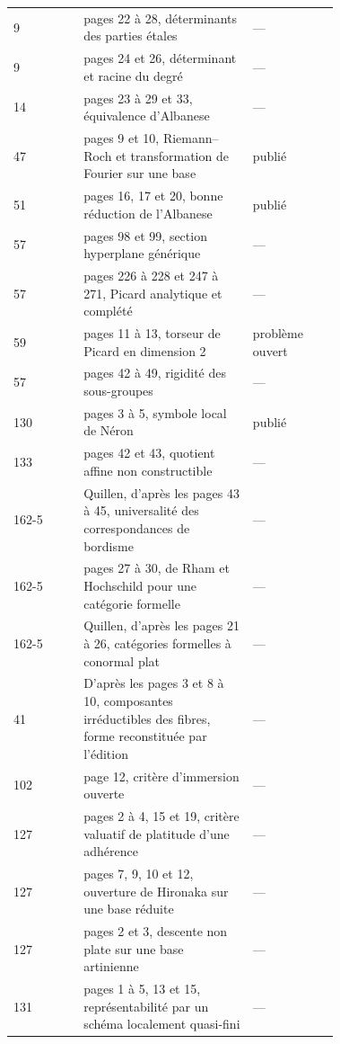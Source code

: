 {\begin{longtable}{@{}l>{\raggedright\arraybackslash}p{0.52\linewidth}>{\raggedright\arraybackslash}p{0.2\linewidth}r@{}}
9 & pages 22 à 28, déterminants des parties étales & --- & \pageref{nv:39}\\
9 & pages 24 et 26, déterminant et racine du degré & --- & \pageref{nv:40}\\
14 & pages 23 à 29 et 33, équivalence d'Albanese & --- & \pageref{nv:41}\\
47 & pages 9 et 10, Riemann--Roch et transformation de Fourier sur une base & publié & \pageref{nv:42}\\
51 & pages 16, 17 et 20, bonne réduction de l'Albanese & publié & \pageref{nv:43}\\
57 & pages 98 et 99, section hyperplane générique & --- & \pageref{nv:44}\\
57 & pages 226 à 228 et 247 à 271, Picard analytique et complété & --- & \pageref{nv:45}\\
59 & pages 11 à 13, torseur de Picard en dimension 2 & problème ouvert & \pageref{nv:46}\\
57 & pages 42 à 49, rigidité des sous-groupes & --- & \pageref{nv:47}\\
130 & pages 3 à 5, symbole local de Néron & publié & \pageref{nv:48}\\
133 & pages 42 et 43, quotient affine non constructible & --- & \pageref{nv:49}\\
162-5 & Quillen, d'après les pages 43 à 45, universalité des correspondances de bordisme & --- & \pageref{nv:50}\\
162-5 & pages 27 à 30, de Rham et Hochschild pour une catégorie formelle & --- & \pageref{nv:51}\\
162-5 & Quillen, d'après les pages 21 à 26, catégories formelles à conormal plat & --- & \pageref{nv:52}\\
41 & D'après les pages 3 et 8 à 10, composantes irréductibles des fibres, forme reconstituée par l'édition & --- & \pageref{nv:53}\\
102 & page 12, critère d'immersion ouverte & --- & \pageref{nv:54}\\
127 & pages 2 à 4, 15 et 19, critère valuatif de platitude d'une adhérence & --- & \pageref{nv:55}\\
127 & pages 7, 9, 10 et 12, ouverture de Hironaka sur une base réduite & --- & \pageref{nv:56}\\
127 & pages 2 et 3, descente non plate sur une base artinienne & --- & \pageref{nv:57}\\
131 & pages 1 à 5, 13 et 15, représentabilité par un schéma localement quasi-fini & --- & \pageref{nv:58}\\

\end{longtable}}
